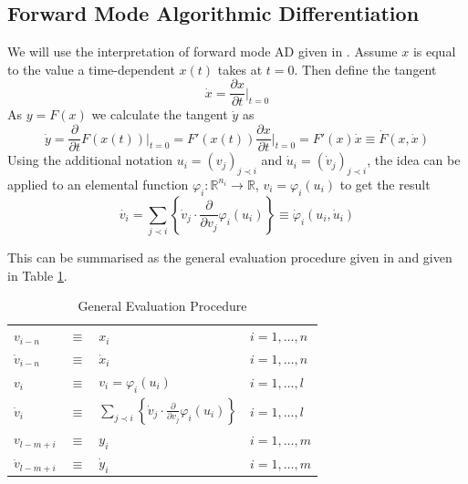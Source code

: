 \documentclass{article}
\begin{document}
\subsection{Forward Mode Algorithmic Differentiation}

We will use the interpretation of forward mode AD given in \cite{dhamarticle}. Assume $x$ is equal to the value a time-dependent $x(t)$ takes at $t=0$. Then define the tangent 
\begin{equation*}
    \Dot{x} = \frac{\partial x}{\partial t} \Bigg|_{t=0}
\end{equation*}
As $y = F(x)$ we calculate the tangent $\Dot{y}$ as
\begin{equation*}
    \Dot{y} = \frac{\partial}{\partial t} F(x (t)) \Bigg|_{t=0} 
    = F'(x (t)) \frac{\partial x}{\partial t} \Bigg|_{t=0}
    = F'(x) \Dot{x}
    \equiv \Dot{F}(x, \Dot{x})
\end{equation*}
Using the additional notation $u_i = (v_j)_{j \prec i}$ and $\Dot{u}_i = (\Dot{v}_j)_{j \prec i}$, the idea can be applied to an elemental function $\varphi_i : \mathbb{R}^{n_i} \longrightarrow \mathbb{R}$, $v_i = \varphi_i (u_i)$ to get the result
\begin{equation*}
    \Dot{v_i} = \sum_{j \prec i} \left\{ \Dot{v}_j \cdot \frac{\partial}{\partial v_j} \varphi_i (u_i) \right\} 
    \equiv \Dot{\varphi}_i(u_i, \Dot{u}_i)
\end{equation*}

This can be summarised as the general evaluation procedure given in \cite{evald} and given in Table \ref{tab:gep}.

\begin{table}[h]
    \centering
    \begin{tabular}{|lcll|}
        \hline
        $v_{i-n}$ & $\equiv$ & $x_i$ & $i = 1, \ldots, n$ \\
        $\Dot{v}_{i-n}$ & $\equiv$ & $\Dot{x}_i$ & $i = 1, \ldots, n$ \\
        \hline
        $v_{i}$ & $\equiv$ & $v_i = \varphi_i (u_i)$ & $i = 1, \ldots, l$ \\
        $\Dot{v}_{i}$ & $\equiv$ & $\sum_{j \prec i} \left\{ \Dot{v}_j \cdot \frac{\partial}{\partial v_j} \varphi_i (u_i) \right\}$ & $i = 1, \ldots, l$ \\
        \hline
        $v_{l-m+i}$ & $\equiv$ & $y_i$ & $i = 1, \ldots, m$ \\
        $\Dot{v}_{l-m+i}$ & $\equiv$ & $\Dot{y}_i$ & $i = 1, \ldots, m$ \\
        \hline
    \end{tabular}
    \caption{General Evaluation Procedure}
    \label{tab:gep}
\end{table}
\end{document}
